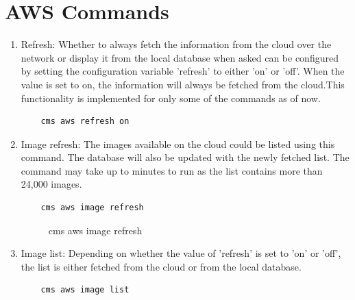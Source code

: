 \documentclass[9pt,twocolumn,twoside]{../../styles/osajnl}
\begin{document}
\section{AWS Commands}

\begin{enumerate}
	
\item Refresh: Whether to always fetch the information from the cloud
  over the network or display it from the local database when asked
  can be configured by setting the configuration variable 'refresh' to
  either 'on' or 'off'. When the value is set to on, the information
  will always be fetched from the cloud.This functionality is
  implemented for only some of the commands as of now.
	
	\begin{verbatim}
    cms aws refresh on
	\end{verbatim}
	
\item Image refresh: The images available on the cloud could be listed
  using this command. The database will also be updated with the newly
  fetched list. The command may take up to minutes to run as the list
  contains more than 24,000 images.
	
	\begin{verbatim}
    cms aws image refresh
	\end{verbatim}
	
	\begin{figure}[h!]
		\centering
		\caption{cms aws image refresh}
		\label{fig:imagerefresh}
	\end{figure}
		
\item Image list: Depending on whether the value of 'refresh' is
      set to 'on' or 'off', the list is either fetched from the
      cloud or from the local database.
	
	\begin{verbatim}
    cms aws image list
	\end{verbatim}
	

\end{enumerate}
\end{document}
